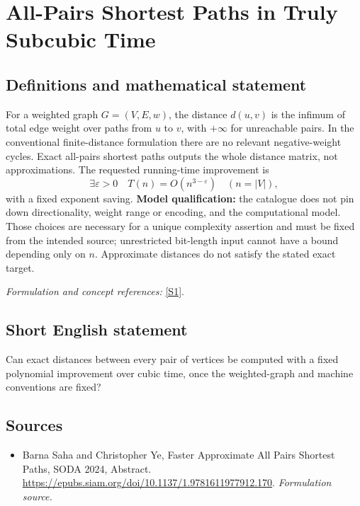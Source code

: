 \documentclass[11pt]{article}
\begin{document}
\section*{\texorpdfstring{All-Pairs Shortest Paths in Truly Subcubic Time}{All-Pairs Shortest Paths in Truly Subcubic Time}}\label{30006803}
\subsection{Definitions and mathematical statement}
For a weighted graph $G=(V,E,w)$, the distance $d(u,v)$ is the infimum of total edge weight over paths from $u$ to $v$, with $+\infty$ for unreachable pairs. In the conventional finite-distance formulation there are no relevant negative-weight cycles. Exact all-pairs shortest paths outputs the whole distance matrix, not approximations. The requested running-time improvement is
\[
 \exists{\varepsilon}>0\quad T(n)=O(n^{3-{\varepsilon}})\quad(n=|V|),
\]
with a fixed exponent saving. \textbf{Model qualification:} the catalogue does not pin down directionality, weight range or encoding, and the computational model. Those choices are necessary for a unique complexity assertion and must be fixed from the intended source; unrestricted bit-length input cannot have a bound depending only on $n$. Approximate distances do not satisfy the stated exact target.
\par\smallskip\textit{Formulation and concept references:} \href{https://epubs.siam.org/doi/10.1137/1.9781611977912.170}{[S1]}.

\subsection{Short English statement}
Can exact distances between every pair of vertices be computed with a fixed polynomial improvement over cubic time, once the weighted-graph and machine conventions are fixed?
\subsection{Sources}
\begin{itemize}
\item[S1]Barna Saha and Christopher Ye, Faster Approximate All Pairs Shortest Paths, SODA 2024, Abstract.
\url{https://epubs.siam.org/doi/10.1137/1.9781611977912.170}.
\textit{Formulation source.}
\end{itemize}
\end{document}

